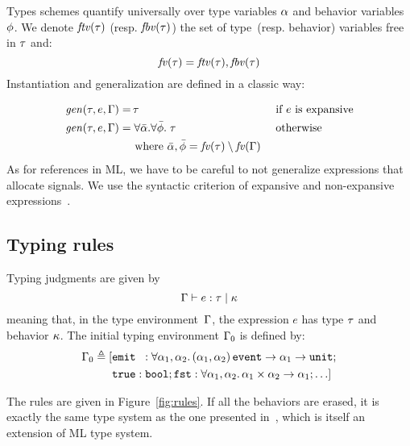 \documentclass[9pt,preprint]{sigplanconf}
\newcommand{\deq}{\triangleq}
\begin{document}
Types schemes quantify universally over type variables $\alpha$ and behavior variables $\phi$. We denote $\mathit{ftv}(\tau)$ (resp. $\mathit{fbv}(\tau)$) the set of type~(resp. behavior) variables free in $\tau$ and:
\[ \mathit{fv}(\tau) = \mathit{ftv}(\tau), \mathit{fbv}(\tau) \] 
Instantiation and generalization are defined in a classic way:
\vspace{-1.3em}
\begin{align*}
\mathit{gen}(\tau, e, \Gamma) = &\, \tau && \text { if $e$ is expansive} \\
\mathit{gen}(\tau, e, \Gamma) = &\; \forall \bar{\alpha}.\forall \bar{\phi}.\; \tau  && \text{ otherwise } \\
  & \text{ where }  \bar{\alpha}, \bar{\phi} = \mathit{fv}(\tau) \setminus \mathit{fv}(\Gamma)  
\end{align*}
As for references in ML, we have to be careful to not generalize expressions that allocate signals. We use the syntactic criterion of expansive and non-expansive expressions~\cite{Tofte:1990}.

\subsection{Typing rules}

Typing judgments are given by 
\[ \Gamma \vdash e : \tau \mid \kappa \] 
meaning that, in the type environment~$\Gamma$, the expression $e$ has type $\tau$ and behavior $\kappa$. The initial typing environment $\Gamma_0$ is defined by: 
\begin{align*}
\Gamma_0 \deq [
 &\eemit{}{} : \forall  \rtvar_1, \rtvar_2. \, 
        \rtarrow{ \rtsig{\rtvar_1}{\rtvar_2} }{\rtarrow{\rtvar_1}{\unit{}} }; \\
        &\mathtt{true} : \mathtt{bool};
              \mathtt{fst} : \forall \rtvar_1, \rtvar_2.\, \rtarrow{\rtprod{\rtvar_1}{\rtvar_2}}{\rtvar_1};  \ldots ]
\end{align*}

The rules are given in Figure~\ref{fig:rules}. If all the behaviors are erased, it is exactly the same type system as the one presented in~\cite{Mandel:2005}, which is itself an extension of ML type system. 
\end{document}
